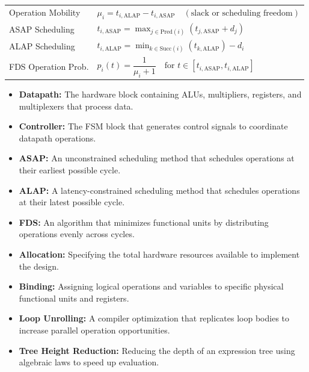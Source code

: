 \documentclass[12pt,a4paper]{article}
\renewcommand{\arraystretch}{1.45}
\begin{document}
\begin{tcolorbox}[formulabox, title={\textbf{Key Formulas and Metrics at a Glance}}]
\renewcommand{\arraystretch}{1.35}
\begin{tabularx}{\linewidth}{B{5.0cm} X}
  Operation Mobility & $\mu_i = t_{i,\text{ALAP}} - t_{i,\text{ASAP}} \quad (\text{slack or scheduling freedom})$ \\[4pt]
  ASAP Scheduling & $t_{i,\text{ASAP}} = \max_{j \in \text{Pred}(i)} \left( t_{j,\text{ASAP}} + d_j \right)$ \\[4pt]
  ALAP Scheduling & $t_{i,\text{ALAP}} = \min_{k \in \text{Succ}(i)} \left( t_{k,\text{ALAP}} \right) - d_i$ \\[4pt]
  FDS Operation Prob. & $p_i(t) = \dfrac{1}{\mu_i + 1} \quad \text{for } t \in [t_{i,\text{ASAP}}, t_{i,\text{ALAP}}]$
\end{tabularx}
\end{tcolorbox}

\vspace{6pt}

\begin{tcolorbox}[defbox, title={\textbf{One-Line Definitions}}]
\begin{itemize}[leftmargin=*, itemsep=3pt, topsep=0pt]
  \item \textbf{Datapath:} The hardware block containing ALUs, multipliers, registers, and multiplexers that process data.
  \item \textbf{Controller:} The FSM block that generates control signals to coordinate datapath operations.
  \item \textbf{ASAP:} An unconstrained scheduling method that schedules operations at their earliest possible cycle.
  \item \textbf{ALAP:} A latency-constrained scheduling method that schedules operations at their latest possible cycle.
  \item \textbf{FDS:} An algorithm that minimizes functional units by distributing operations evenly across cycles.
  \item \textbf{Allocation:} Specifying the total hardware resources available to implement the design.
  \item \textbf{Binding:} Assigning logical operations and variables to specific physical functional units and registers.
  \item \textbf{Loop Unrolling:} A compiler optimization that replicates loop bodies to increase parallel operation opportunities.
  \item \textbf{Tree Height Reduction:} Reducing the depth of an expression tree using algebraic laws to speed up evaluation.
\end{itemize}
\end{tcolorbox}
\end{document}
